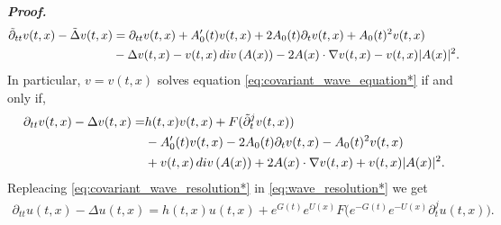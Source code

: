\documentclass[10pt,a4paper]{amsart}
\renewcommand{\div}{\mathinner{\mathop{{\rm div}}}}
\renewenvironment{proof}{\smallskip\noindent\emph{\textbf{Proof.}}%
  \hspace{1pt}}{\hspace{-5pt}{\nobreak\quad\nobreak\hfill\nobreak%
    $\square$\vspace{2pt}\par}\smallskip\goodbreak}
\begin{document}
\begin{proof}
\begin{equation*}
\begin{aligned}
\tilde \partial_{tt}v(t,x)-\tilde \Delta v(t,x)&= \partial_{tt}v(t,x)+ A_0'(t)v(t,x)+2 A_0(t)\partial_t v(t,x)+ A_0(t)^2 v(t,x) \\
% 
& -\Delta v(t,x)-v(t,x)\div(A(x))-2A (x)\cdot \nabla v(t,x)-v(t,x)|A (x)|^2 .
\end{aligned}
\end{equation*}
%
In particular, $v=v(t,x)$ solves equation \eqref{eq:covariant_wave_equation*} if and only if, 
%
\begin{equation}
\label{eq:covariant_wave_resolution*}
\begin{aligned}
\partial_{tt}v(t,x)-\Delta v(t,x)=&h(t,x)v(t,x)+F(\tilde \partial_t^j v(t,x))\\
&- A_0'(t)v(t,x)-2 A_0(t)\partial_t v(t,x)- A_0(t)^2 v(t,x) \\
% 
&+v(t,x)\div(A(x))+2A(x)\cdot \nabla v(t,x)+v(t,x)|A(x)|^2.
\end{aligned}
\end{equation}
%
Repleacing \eqref{eq:covariant_wave_resolution*} in \eqref{eq:wave_resolution*} we get
%
\begin{equation*}
\begin{aligned}
\partial_{tt}u(t,x) - \Delta u(t,x)=
%
%
%
h(t,x)u(t,x)+e^{G(t)} e^{U(x)}F\Big(e^{-G(t)} e^{-U(x)}\partial_t^j u(t,x)\Big).
\end{aligned}
\end{equation*}
%
\end{proof}
\end{document}
